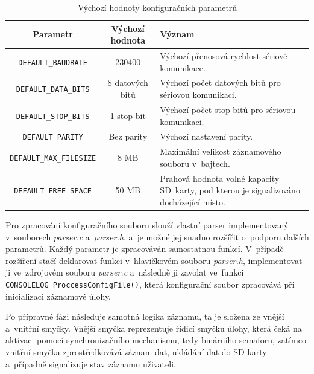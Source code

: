 \begin{table}[h]
    \centering
    \begin{tabularx}{\textwidth}{|c|c|X|}
        \hline
        \textbf{Parametr} & \textbf{Výchozí hodnota} & \textbf{Význam} \\
        \hline
        \texttt{DEFAULT\_BAUDRATE} & 230400 & Výchozí přenosová rychlost sériové komunikace. \\
        \hline
        \texttt{DEFAULT\_DATA\_BITS} & 8 datových bitů & Výchozí počet datových bitů pro sériovou komunikaci. \\
        \hline
        \texttt{DEFAULT\_STOP\_BITS} & 1 stop bit & Výchozí počet stop bitů pro sériovou komunikaci. \\
        \hline
        \texttt{DEFAULT\_PARITY} & Bez parity & Výchozí nastavení parity. \\
        \hline
        \texttt{DEFAULT\_MAX\_FILESIZE} & 8 MB & Maximální velikost záznamového souboru v~bajtech. \\
        \hline
        \texttt{DEFAULT\_FREE\_SPACE} & 50 MB & Prahová hodnota volné kapacity SD~karty, pod kterou je signalizováno docházející místo. \\
        \hline
    \end{tabularx}
    \caption{Výchozí hodnoty konfiguračních parametrů}
    \label{tab:default-parameters}
\end{table}

Pro zpracování konfiguračního souboru slouží vlastní parser implementovaný v~souborech \textit{parser.c} a~\textit{parser.h}, a~je možné jej snadno rozšířit o~podporu dalších parametrů. Každý parametr je zpracováván samostatnou funkcí. V~případě rozšíření stačí deklarovat funkci v~hlavičkovém souboru \textit{parser.h}, implementovat ji ve~zdrojovém souboru \textit{parser.c} a~následně ji zavolat ve~funkci \texttt{CONSOLELOG\_ProccessConfigFile()}, která konfigurační soubor zpracovává při inicializaci záznamové úlohy.

Po přípravné fázi následuje samotná logika záznamu, ta je složena ze vnější a~vnitřní smyčky. Vnější smyčka reprezentuje řídicí smyčku úlohy, která čeká na aktivaci pomocí synchronizačního mechanismu, tedy binárního semaforu, zatímco vnitřní smyčka zprostředkovává záznam dat, ukládání dat do SD karty a~případně signalizuje stav záznamu uživateli.

